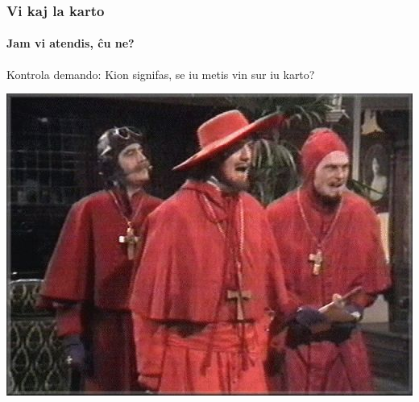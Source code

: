 	    

  \begin{frame}
    \frametitle{Vi kaj la karto}
    \framesubtitle{Jam vi atendis, ĉu ne?}
	
	\begin{center}
		\begin{block}{Kontrola demando:}
			Kion signifas, se iu metis vin sur iu karto?
		\end{block}
	\end{center}
	
	\begin{center}
	    \includegraphics[scale=0.3]{meme/hispana_inkvizicio}
    \end{center}	    
    
  \end{frame}
	    

%    	
%    
%    
%    
%        
%    


